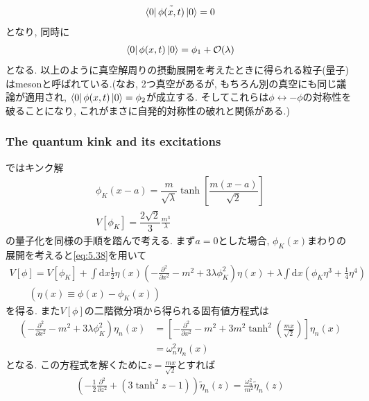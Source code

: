 \documentclass[dvipdfmx,11pt,a4paper,oneside,openany]{jsbook}
\begin{document}
\begin{align}
    \bra{0}\tilde{\phi(x,t)}\ket{0}=0
\end{align}
となり, 同時に
\begin{align}
    \bra{0}\phi(x,t)\ket{0}=\phi_1+\mathcal{O}(\lambda)
\end{align}
となる. 以上のように真空解周りの摂動展開を考えたときに得られる粒子(量子)はmesonと呼ばれている.(なお, 2つ真空があるが, もちろん別の真空にも同じ議論が適用され, $\bra{0}\phi(x,t)\ket{0}=\phi_2$が成立する. そしてこれらは$\phi\leftrightarrow-\phi$の対称性を破ることになり, これがまさに自発的対称性の破れと関係がある.)

\subsubsection{The quantum kink and its excitations}
ではキンク解
\begin{align}
    \phi_{K}(x-a)=\dfrac{m}{\sqrt{\lambda}} \tanh [\dfrac{m(x-a)}{\sqrt{2}}] \\
    V[\phi_{K}]=\dfrac{2\sqrt{2}}{3}\frac{m^3}{\lambda}
\end{align}
の量子化を同様の手順を踏んで考える. まず$a=0$とした場合, $\phi_K(x)$まわりの展開を考えると\eqref{eq:5.38}を用いて
\begin{align}
    V[\phi]=V\left[\phi_{K}\right]+\int \mathrm{d} x \frac{1}{2} \eta(x)\left(-\frac{\partial^{2}}{\partial x^{2}}-m^{2}+3 \lambda \phi_{K}^{2}\right) \eta(x)+\lambda\int\mathrm{d}x\left(\phi_{K}\eta^3+\frac{1}{4}\eta^4\right) \\
    \qquad \left(\eta(x)\equiv \phi(x)-\phi_{K}(x)\right)\nonumber
\end{align}
を得る. また$V[\phi]$の二階微分項から得られる固有値方程式は
\begin{align}
    \left(-\frac{\partial^{2}}{\partial x^{2}}-m^{2}+3 \lambda \phi_{K}^{2}\right) \eta_{n}(x) & =\left[-\frac{\partial^{2}}{\partial x^{2}}-m^{2}+3 m^{2} \tanh ^{2}\left(\frac{m x}{\sqrt{2}}\right)\right] \eta_{n}(x)\nonumber \\
                                                                                               & =\omega_n^2\eta_n(x)
\end{align}
となる. この方程式を解くために$z=\frac{mx}{\sqrt{2}}$とすれば
\begin{align}
    \left(-\frac{1}{2} \frac{\partial^{2}}{\partial z^{2}}+\left(3 \tanh ^{2} z-1\right)\right) \tilde{\eta}_{n}(z)=\frac{\omega_{n}^{2}}{m^{2}} \tilde{\eta}_{n}(z)
\end{align}
\end{document}
